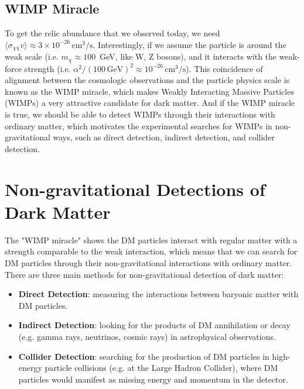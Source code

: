 \bigskip \noindent \bigskip \noindent \bigskip \noindent
\subsection{WIMP Miracle}
\begin{intuition}
    To get the relic abundance that we observed today, we need $\langle \sigma_{\chi \bar{\chi}} v \rangle \approx 3 \times 10^{-26} \, \mathrm{cm}^3/\mathrm{s}$. Interestingly, if we assume the particle is around the weak scale (i.e. $m_\chi \approx 100$~GeV, like W, Z bosons), and it interacts with the weak-force strength (i.e. $\alpha^2 / ( 100 \, \mathrm{GeV} )^2 \approx 10^{-26} \, \mathrm{cm}^3/\mathrm{s}$). This coincidence of alignment between the cosmologic observations and the particle physics scale is known as the WIMP miracle, which makes Weakly Interacting Massive Particles (WIMPs) a very attractive candidate for dark matter. And if the WIMP miracle is true, we should be able to detect WIMPs through their interactions with ordinary matter, which motivates the experimental searches for WIMPs in non-gravitational ways, such as direct detection, indirect detection, and collider detection.
\end{intuition}






\clearpage
\section{Non-gravitational Detections of Dark Matter}
The "WIMP miracle" shows the DM particles interact with regular matter with a strength comparable to the weak interaction, which means that we can search for DM particles through their non-gravitational interactions with ordinary matter. There are three main methods for non-gravitational detection of dark matter: 
\begin{itemize}
    \item \textbf{Direct Detection}: measuring the interactions between baryonic matter with DM particles.
    \item \textbf{Indirect Detection}: looking for the products of DM annihilation or decay (e.g. gamma rays, neutrinos, cosmic rays) in astrophysical observations.
    \item \textbf{Collider Detection}: searching for the production of DM particles in high-energy particle collisions (e.g. at the Large Hadron Collider), where DM particles would manifest as missing energy and momentum in the detector.
\end{itemize}

